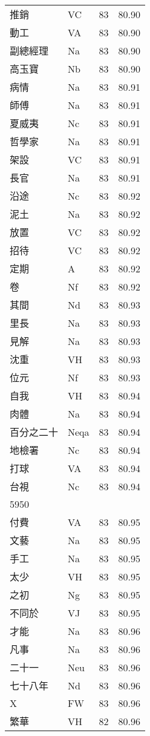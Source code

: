 \documentclass[twocolumn]{book}
\begin{document}
\begin{supertabular}{llrr}
推銷 & VC & 83 &  80.90\\
動工 & VA & 83 &  80.90\\
副總經理 & Na & 83 &  80.90\\
高玉寶 & Nb & 83 &  80.90\\
病情 & Na & 83 &  80.91\\
師傅 & Na & 83 &  80.91\\
夏威夷 & Nc & 83 &  80.91\\
哲學家 & Na & 83 &  80.91\\
架設 & VC & 83 &  80.91\\
長官 & Na & 83 &  80.91\\
沿途 & Nc & 83 &  80.92\\
泥土 & Na & 83 &  80.92\\
放置 & VC & 83 &  80.92\\
招待 & VC & 83 &  80.92\\
定期 & A & 83 &  80.92\\
卷 & Nf & 83 &  80.92\\
其間 & Nd & 83 &  80.93\\
里長 & Na & 83 &  80.93\\
見解 & Na & 83 &  80.93\\
沈重 & VH & 83 &  80.93\\
位元 & Nf & 83 &  80.93\\
自我 & VH & 83 &  80.94\\
肉體 & Na & 83 &  80.94\\
百分之二十 & Neqa & 83 &  80.94\\
地檢署 & Nc & 83 &  80.94\\
打球 & VA & 83 &  80.94\\
台視 & Nc & 83 &  80.94\\
5950\\
付費 & VA & 83 &  80.95\\
文藝 & Na & 83 &  80.95\\
手工 & Na & 83 &  80.95\\
太少 & VH & 83 &  80.95\\
之初 & Ng & 83 &  80.95\\
不同於 & VJ & 83 &  80.95\\
才能 & Na & 83 &  80.96\\
凡事 & Na & 83 &  80.96\\
二十一 & Neu & 83 &  80.96\\
七十八年 & Nd & 83 &  80.96\\
X & FW & 83 &  80.96\\
繁華 & VH & 82 &  80.96\\

\end{supertabular}
\end{document}
